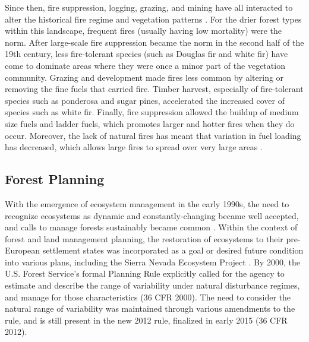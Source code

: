 Since then, fire suppression, logging, grazing, and mining have all interacted to alter the historical fire regime and vegetation patterns \citep{Stephens2015,Knapp2013}. For the drier forest types within this landscape, frequent fires (usually having low mortality) were the norm. After large-scale fire suppression became the norm in the second half of the 19th century, less fire-tolerant species (such as Douglas fir and white fir) have come to dominate areas where they were once a minor part of the vegetation community. Grazing and development made fires less common by altering or removing the fine fuels that carried fire. Timber harvest, especially of fire-tolerant species such as ponderosa and sugar pines, accelerated the increased cover of species such as white fir. Finally, fire suppression allowed the buildup of medium size fuels and ladder fuels, which promotes larger and hotter fires when they do occur. Moreover, the lack of natural fires has meant that variation in fuel loading has decreased, which allows large fires to spread over very large areas \citep{Hessburg2005}.


\subsection{Forest Planning}
With the emergence of ecosystem management in the early 1990s, the need to recognize ecosystems as dynamic and constantly-changing became well accepted, and calls to manage forests sustainably became common \citep{Christensen1996}. Within the context of forest and land management planning, the restoration of ecosystems to their pre-European settlement states was incorporated as a goal or desired future condition into various plans, including the Sierra Nevada Ecosystem Project \cite{SNEP1996a}. By 2000, the U.S. Forest Service's formal Planning Rule explicitly called for the agency to estimate and describe the range of variability under natural disturbance regimes, and manage for those characteristics (36 CFR  2000). The need to consider the natural range of variability was maintained through various amendments to the rule, and is still present in the new 2012 rule, finalized in early 2015 (36 CFR  2012).


